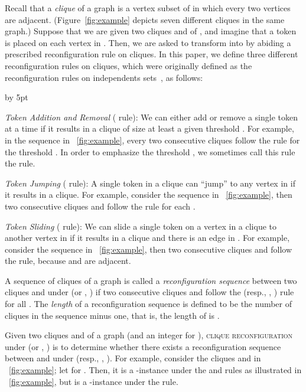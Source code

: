 \documentclass{llncs}
\newcounter{one}
\newcounter{two}
\newcounter{three}
\begin{document}
	Recall that a {\em clique} of a graph  is a vertex subset of  in which every two vertices are adjacent. 
(Figure~\ref{fig:example} depicts seven different cliques in the same graph.)
	Suppose that we are given two cliques  and  of , and imagine that a token is placed on each vertex in . 
	Then, we are asked to transform  into  by abiding a prescribed reconfiguration rule on cliques.
	In this paper, we define three different reconfiguration rules on cliques, which were originally defined as the reconfiguration rules on independents sets~\cite{KaminskiMM12}, as follows:
\begin{list}{*}{\settowidth{\labelwidth}{}\setlength{\leftmargin}{\labelwidth}\advance \leftmargin by 5pt
	\setlength{\itemsep}{5pt}\setlength{\parsep}{0pt}\setlength{\topsep}{5pt}\setlength{\parskip}{0pt}}
	\item[] {\em Token Addition and Removal} ( rule): 
    We can either add or remove a single token at a time 
    if it results in a clique of size at least a given threshold . 
For example, in the sequence  in \figurename~\ref{fig:example}, every two consecutive cliques follow the  rule for the threshold .
    In order to emphasize the threshold , we sometimes call this rule the  rule. 

	\item[] {\em Token Jumping} ( rule): 
    A single token in a clique  can ``jump'' to any vertex in  if it results in a clique.
    For example, consider the sequence  in \figurename~\ref{fig:example}, then two consecutive cliques  and  follow the  rule for each .

	\item[]{\em Token Sliding} ( rule): 
    We can slide a single token on a vertex  in a clique  to another vertex  in  if  it results in a clique and there is an edge  in .
    For example, consider the sequence  in \figurename~\ref{fig:example}, then two consecutive cliques  and  follow the  rule, because  and  are adjacent.
	\end{list}
	A sequence  of cliques of a graph  is called a {\em reconfiguration sequence} between two cliques  and  under  (or , ) if two consecutive cliques  and  follow the  (resp., , ) rule for all .
	The \emph{length} of a reconfiguration sequence is defined to be the number of cliques in the sequence minus one, that is, the length of   is .

	Given two cliques  and  of a graph  (and an integer  for ), \textsc{clique reconfiguration} under  (or , ) is to determine whether there exists a reconfiguration sequence between  and  under  (resp., , ). 
	For example, consider the cliques  and  in \figurename~\ref{fig:example}; let  for . 
	Then, it is a -instance under the  and  rules as illustrated in \figurename~\ref{fig:example}, but is a -instance under the  rule.
\end{document}
